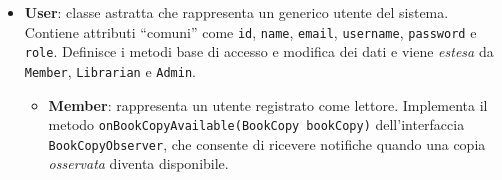 \documentclass[
  italian,
  paper=a4,
  ,captions=tableheading
]{scrbook}
\newcommand{\passthrough}[1]{#1}
\begin{document}
\begin{itemize}
\item
  \textbf{User}: classe astratta che rappresenta un generico utente del
  sistema. Contiene attributi ``comuni'' come
  \passthrough{\lstinline!id!}, \passthrough{\lstinline!name!},
  \passthrough{\lstinline!email!}, \passthrough{\lstinline!username!},
  \passthrough{\lstinline!password!} e \passthrough{\lstinline!role!}.
  Definisce i metodi base di accesso e modifica dei dati e viene
  \emph{estesa} da \passthrough{\lstinline!Member!},
  \passthrough{\lstinline!Librarian!} e \passthrough{\lstinline!Admin!}.

  \begin{itemize}
  \item
    \textbf{Member}: rappresenta un utente registrato come lettore.
    Implementa il metodo
    \passthrough{\lstinline!onBookCopyAvailable(BookCopy bookCopy)!}
    dell'interfaccia \passthrough{\lstinline!BookCopyObserver!}, che
    consente di ricevere notifiche quando una copia \emph{osservata}
    diventa disponibile.


\end{itemize}
\end{itemize}
\end{document}
